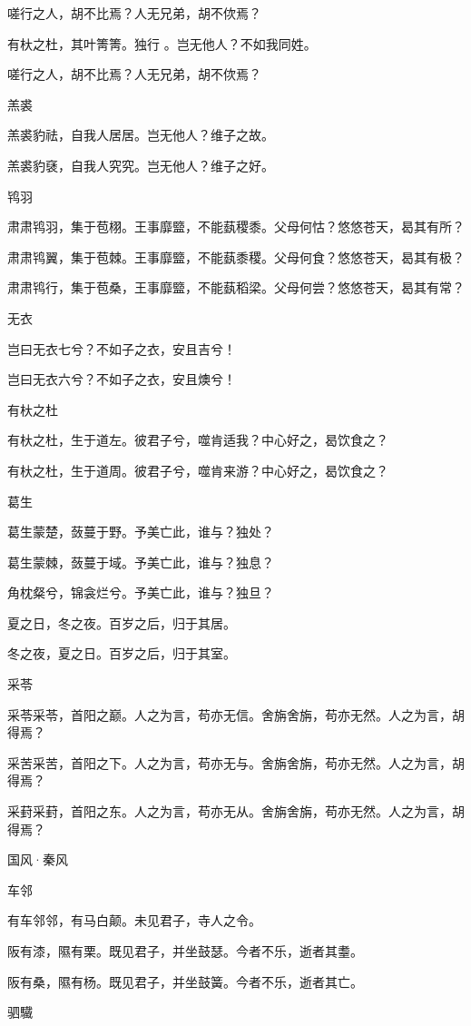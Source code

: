 嗟行之人，胡不比焉？人无兄弟，胡不佽焉？

有杕之杜，其叶箐箐。独行 。岂无他人？不如我同姓。

嗟行之人，胡不比焉？人无兄弟，胡不佽焉？

羔裘

羔裘豹祛，自我人居居。岂无他人？维子之故。

羔裘豹褎，自我人究究。岂无他人？维子之好。

鸨羽

肃肃鸨羽，集于苞栩。王事靡盬，不能蓺稷黍。父母何怙？悠悠苍天，曷其有所？

肃肃鸨翼，集于苞棘。王事靡盬，不能蓺黍稷。父母何食？悠悠苍天，曷其有极？

肃肃鸨行，集于苞桑，王事靡盬，不能蓺稻梁。父母何尝？悠悠苍天，曷其有常？

无衣

岂曰无衣七兮？不如子之衣，安且吉兮！

岂曰无衣六兮？不如子之衣，安且燠兮！

有杕之杜

有杕之杜，生于道左。彼君子兮，噬肯适我？中心好之，曷饮食之？

有杕之杜，生于道周。彼君子兮，噬肯来游？中心好之，曷饮食之？

葛生

葛生蒙楚，蔹蔓于野。予美亡此，谁与？独处？

葛生蒙棘，蔹蔓于域。予美亡此，谁与？独息？

角枕粲兮，锦衾烂兮。予美亡此，谁与？独旦？

夏之日，冬之夜。百岁之后，归于其居。

冬之夜，夏之日。百岁之后，归于其室。

采苓

采苓采苓，首阳之巅。人之为言，苟亦无信。舍旃舍旃，苟亦无然。人之为言，胡得焉？

采苦采苦，首阳之下。人之为言，苟亦无与。舍旃舍旃，苟亦无然。人之为言，胡得焉？

采葑采葑，首阳之东。人之为言，苟亦无从。舍旃舍旃，苟亦无然。人之为言，胡得焉？




国风·秦风


车邻

有车邻邻，有马白颠。未见君子，寺人之令。

阪有漆，隰有栗。既见君子，并坐鼓瑟。今者不乐，逝者其耋。

阪有桑，隰有杨。既见君子，并坐鼓簧。今者不乐，逝者其亡。

驷驖

